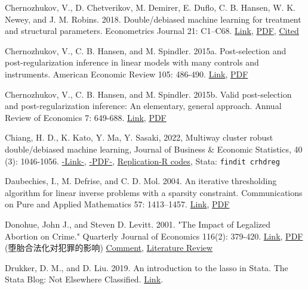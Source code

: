 {Chernozhukov, V., D. Chetverikov, M. Demirer, E. Duflo, C. B. Hansen, W. K. Newey, and J. M. Robins. 2018.
Double/debiased machine learning for treatment and structural parameters. Econometrics Journal 21: C1–C68.
\href{https://doi.org/10.1111/ectj.12097}{Link}, \href{http://sci-hub.ren/10.1111/ectj.12097}{PDF}, \href{https://xs2.dailyheadlines.cc/scholar?cites=17289873169606420768&as_sdt=2005&sciodt=0,5&hl=zh-CN}{Cited}

Chernozhukov, V., C. B. Hansen, and M. Spindler. 2015a. 
Post-selection and post-regularization inference in linear models with many controls and instruments. American Economic Review 105: 486-490. 
\href{https://doi.org/10.1257/aer.p20151022}{Link}, \href{http://sci-hub.ren/10.1257/aer.p20151022}{PDF}

Chernozhukov, V., C. B. Hansen, and M. Spindler. 
2015b. Valid post-selection and post-regularization inference: An elementary, general approach. Annual Review of Economics 7: 649-688. \href{https://doi.org/10.1146/annurev-economics-012315-015826}{Link}, \href{http://sci-hub.ren/10.1146/annurev-economics-012315-015826}{PDF}


Chiang, H. D., K. Kato, Y. Ma, Y. Sasaki, 2022, Multiway cluster robust double/debiased machine learning, Journal of Business \& Economic Statistics, 40 (3): 1046-1056. \href{https://doi.org/10.1080/07350015.2021.1895815}{-Link-}, \href{https://sci-hub.ren/10.1080/07350015.2021.1895815}{-PDF-}, \href{https://www.tandfonline.com/doi/suppl/10.1080/07350015.2021.1895815?scroll=top}{Replication-R codes}, Stata: \texttt{findit crhdreg}

Daubechies, I., M. Defrise, and C. D. Mol. 2004. An iterative thresholding algorithm for linear inverse
problems with a sparsity constraint. Communications on Pure and Applied Mathematics 57: 1413–1457.
\href{https://doi.org/10.1002/cpa.20042}{Link}, \href{http://sci-hub.ren/10.1002/cpa.20042}{PDF}

Donohue, John J., and Steven D. Levitt. 2001. "The Impact of Legalized Abortion on Crime." Quarterly Journal of Economics 116(2): 379-420. \href{https://doi.org/10.1162/00335530151144050}{Link}, \href{http://sci-hub.ren/10.1162/00335530151144050}{PDF} (堕胎合法化对犯罪的影响)
\href{http://sci-hub.ren/10.1162/qjec.2008.123.1.407}{Comment}, \href{http://sci-hub.ren/10.1093/aler/ahaa008}{Literature Review}

Drukker, D. M., and D. Liu. 2019. An introduction to the lasso in Stata. The Stata Blog: Not Elsewhere Classified.
\href{https://blog.stata.com/2019/09/09/an-introduction-to-the-lasso-in-stata/}{Link}.

}

